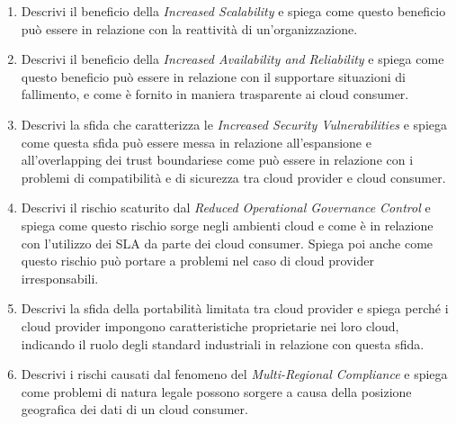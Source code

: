 \begin{enumerate}
    \item Descrivi il beneficio della \textit{Increased Scalability} e spiega come questo beneficio può essere in relazione con la reattività di un'organizzazione.
    \item Descrivi il beneficio della \textit{Increased Availability and Reliability} e spiega come questo beneficio può essere in relazione con il supportare situazioni di fallimento, e come è fornito in maniera trasparente ai cloud consumer.
    \item Descrivi la sfida che caratterizza le \textit{Increased Security Vulnerabilities} e spiega come questa sfida può essere messa in relazione all'espansione e all'overlapping dei trust boundariese come può essere in relazione con i problemi di compatibilità e di sicurezza tra cloud provider e cloud consumer. 
    \item Descrivi il rischio scaturito dal \textit{Reduced Operational Governance Control} e spiega come questo rischio sorge negli ambienti cloud e come è in relazione con l'utilizzo dei SLA da parte dei cloud consumer. Spiega poi anche come questo rischio può portare a problemi nel caso di cloud provider irresponsabili.
    \item Descrivi la sfida della portabilità limitata tra cloud provider e spiega perché i cloud provider impongono caratteristiche proprietarie nei loro cloud, indicando il ruolo degli standard industriali in relazione con questa sfida.
    \item Descrivi i rischi causati dal fenomeno del \textit{Multi-Regional Compliance} e spiega come problemi di natura legale possono sorgere a causa della posizione geografica dei dati di un cloud consumer.
\end{enumerate} 

